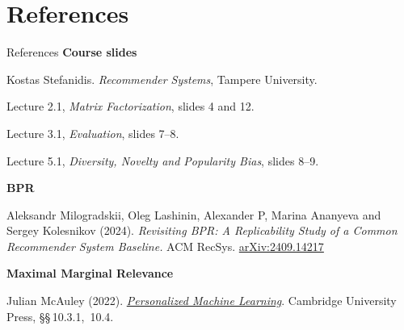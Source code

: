 \documentclass[aspectratio=169,9pt,t]{beamer}
\begin{document}
\section{References}
\begin{frame}{References}
  \textbf{Course slides}\par\smallskip
  Kostas Stefanidis. \textit{Recommender Systems}, Tampere University.\par
  Lecture 2.1, \textit{Matrix Factorization}, slides 4 and 12.\par
  Lecture 3.1, \textit{Evaluation}, slides 7--8.\par
  Lecture 5.1, \textit{Diversity, Novelty and Popularity Bias}, slides 8--9.

  \bigskip
  \textbf{BPR}\par\smallskip
  Aleksandr Milogradskii, Oleg Lashinin, Alexander P, Marina Ananyeva and Sergey Kolesnikov (2024).
  \textit{Revisiting BPR: A Replicability Study of a Common Recommender System Baseline.}
  ACM RecSys. \href{https://arxiv.org/pdf/2409.14217}{\color{Accent}arXiv:2409.14217}

  \bigskip
  \textbf{Maximal Marginal Relevance}\par\smallskip
  Julian McAuley (2022).
  \href{https://cseweb.ucsd.edu/~jmcauley/pml/pml_book.pdf}{\color{Accent}\textit{Personalized Machine Learning}}.
  Cambridge University Press, \mbox{\S\S\,10.3.1, 10.4}.
\end{frame}
\end{document}
